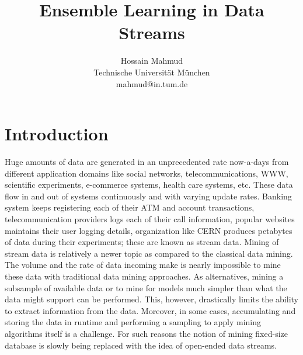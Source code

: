 \documentclass[a4paper, 11pt, oneside]{book}
\begin{document}
\title{Ensemble Learning in Data Streams}


\author{
Hossain Mahmud \\
Technische Universit\"at M\"unchen\\
mahmud@in.tum.de\\
}

\date{}

{}
\onehalfspacing
\tableofcontents
\clearpage

\listoftables
{}
\clearpage

\listoffigures
{}
\clearpage

\listofalgorithms
{}
\clearpage

\onehalfspacing
{}
\setcounter{page}{1}

\chapter{Introduction}
\label{chp:intro}
Huge amounts of data are generated in an unprecedented rate now-a-days from different application domains like social networks, telecommunications, WWW, scientific experiments, e-commerce systems, health care systems, etc. These data flow in and out of systems continuously and with varying update rates. Banking system keeps registering each of their ATM and account transactions, telecommunication providers logs each of their call information, popular websites maintains their user logging details, organization like CERN produces petabytes of data during their experiments; these are known as stream data. Mining of stream data is relatively a newer topic as compared to the classical data mining. The volume and the rate of data incoming make is nearly impossible to mine these data with traditional data mining approaches. As alternatives, mining a subsample of available data or to mine for models much simpler than what the data might support can be performed. This, however, drastically limits the ability to extract information from the data. Moreover, in some cases, accumulating and storing the data in runtime and performing a sampling to apply mining algorithms itself is a challenge. For such reasons the notion of mining fixed-size database is slowly being replaced with the idea of open-ended data streams.
\end{document}
